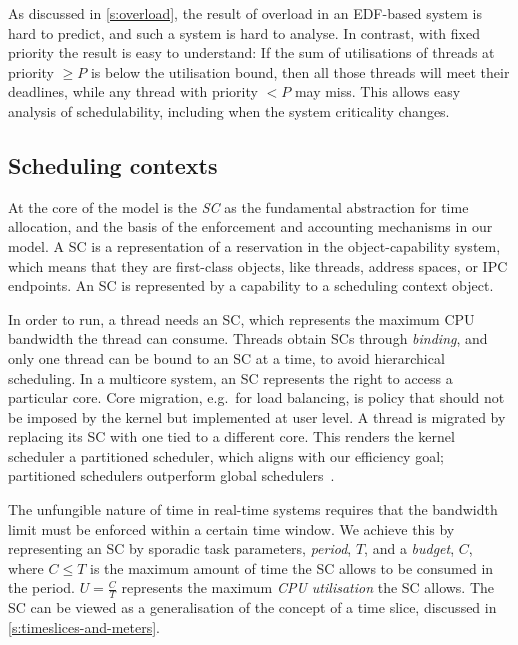 As discussed in \autoref{s:overload}, the result of overload in an
EDF-based system is hard to predict, and such a system is hard to
analyse. In contrast, with fixed priority the result is easy to
understand: If the sum of utilisations of threads at priority \(\geq
P\) is below the utilisation bound, then all those threads will meet
their deadlines, while any thread with priority \(<P\) may miss. This
allows easy analysis of schedulability, including when the system
criticality changes.

\subsection{Scheduling contexts}
\label{sec:model-scheduling-contexts}

At the core of the model is the \emph{\gls{SC}} as the
fundamental abstraction for time allocation, and the basis of 
the enforcement and accounting mechanisms in our model.
A \gls{SC} is a representation
of a reservation in the object-capability system, which means that 
they are first-class objects, like threads, address spaces, or
\gls{IPC} endpoints. An SC is represented by a capability to a
scheduling context object.

In order to run, a thread needs an \gls{SC}, which represents the
maximum CPU bandwidth the thread can consume. Threads obtain \glspl{SC} through \emph{binding}, and
only one thread can be bound to an \gls{SC} at a time, to avoid hierarchical scheduling.
In a multicore system, an SC represents the right to access a
particular core. Core migration, e.g.\ for load balancing, is policy
that should not be imposed by the kernel but implemented at user
level. A thread is migrated by replacing its SC with one tied to a
different core. This renders the kernel scheduler a partitioned scheduler, 
which aligns with our efficiency goal; partitioned schedulers outperform global
schedulers~\citep{Brandenburg:phd}.

The unfungible nature of time in real-time systems requires that the
bandwidth limit must be enforced within a certain time window. We
achieve this by representing an SC by sporadic task parameters, \emph{period}, \(T\), and a
\emph{budget}, \(C\), where \(C\leq T\) is the maximum amount of time
the SC allows to be consumed in the period. \(U=\frac{C}{T}\) represents the
maximum \emph{CPU utilisation} the SC allows. The SC can be viewed as
a generalisation of the concept of a time slice, discussed in \cref{s:timeslices-and-meters}.

